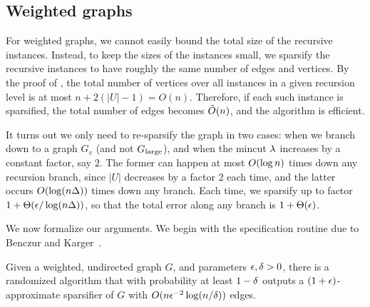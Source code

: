 \subsection{Weighted graphs}


For weighted graphs, we cannot easily bound the total size of the recursive instances. Instead, to keep the sizes of the instances small, we sparsify the recursive instances to have roughly the same number of edges and vertices. By the proof of , the total number of vertices over all instances in a given recursion level is at most $n+2(|U|-1)=O(n)$. Therefore, if each such instance is sparsified, the total number of edges becomes $\tilde{O}(n)$, and the algorithm is efficient.

It turns out we only need to re-sparsify the graph in two cases: when we branch down to a graph $G_v$ (and not $G_{\textup{large}}$), and when the mincut $\lambda$ increases by a constant factor, say $2$. The former can happen at most $O(\log n)$ times down any recursion branch, since $|U|$ decreases by a factor $2$ each time, and the latter occurs $O(\log(n\Delta))$ times down any branch. Each time, we sparsify up to factor $1+\Theta(\epsilon/\log(n\Delta))$, so that the total error along any branch is $1+\Theta(\epsilon)$. 

We now formalize our arguments. We begin with the specification routine due to Benczur and Karger~\cite{BenczurKarger1996}.

\BT{}
Given a weighted, undirected graph $G$, and parameters $\epsilon,\delta>0$, there is a randomized algorithm that with probability at least $1-\delta$ outputs a $(1+\epsilon)$-approximate sparsifier of $G$ with $O(n\epsilon^{-2}\log(n/\delta))$ edges. %
\ET


